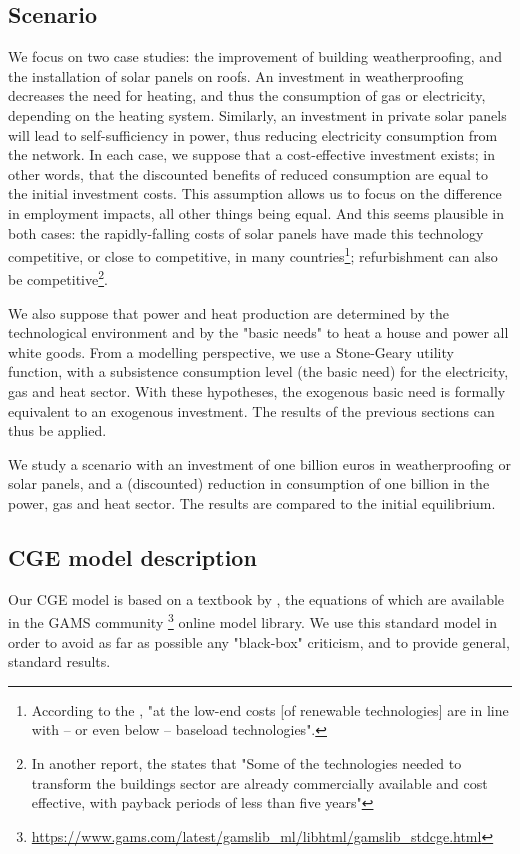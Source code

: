 \subsection{Scenario}
We focus on two case studies: the improvement of building weatherproofing, and the installation of solar panels on roofs. 
An investment in weatherproofing decreases the need for heating, and thus the consumption of gas or electricity, depending on the heating system. Similarly, an investment in private solar panels will lead to self-sufficiency in power, thus reducing electricity consumption from the network. 
In each case, we suppose that a cost-effective investment exists; in other words, that the discounted benefits of reduced consumption are equal to the initial investment costs. This assumption allows us to focus on the difference in employment impacts, all other things being equal. And this seems plausible in both cases: the rapidly-falling costs of solar panels have made this technology competitive, or close to competitive, in many countries\footnote{According to the \citet{InternationalEnergyAgency2015}, "at the low-end costs [of renewable technologies] are in line with – or even below – baseload technologies".}; refurbishment can also be competitive\footnote{In another report, the \citet{InternationalEnergyAgency2013} states that "Some of the technologies needed to transform the buildings sector are already commercially available and cost effective, with payback periods of less than five years"}.

We also suppose that power and heat production are determined by the technological environment and by the "basic needs" to heat a house and power all white goods. From a modelling perspective, we use a Stone-Geary utility function, with a subsistence consumption level (the basic need) for the electricity, gas and heat sector.
With these hypotheses, the exogenous basic need is formally equivalent to an exogenous investment. The results of the previous sections can thus be applied.

We study a scenario with an investment of one billion euros in weatherproofing or solar panels, and a (discounted) reduction in consumption of one billion in the power, gas and heat sector.
The results are compared to the initial equilibrium. 


\subsection{CGE model description}
Our CGE model is based on a textbook by \citet{Hosoe2010}, the equations of which are available in the GAMS community \footnote{\url{https://www.gams.com/latest/gamslib\_ml/libhtml/gamslib\_stdcge.html}} online model library. 
We use this standard model in order to avoid as far as possible any "black-box" criticism, and to provide general, standard results.


